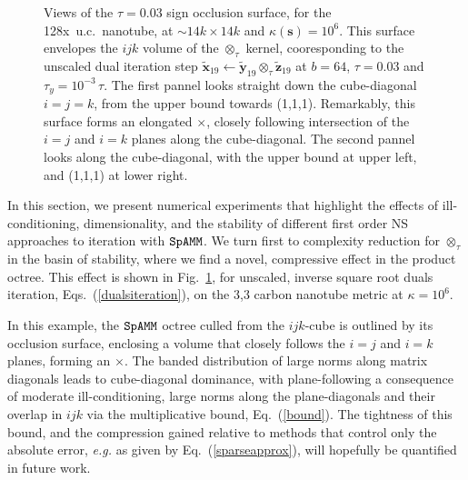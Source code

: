 \documentclass[letterpaper,twocolumn,amsmath,amsfont,amssymb,english,aps,jcp,preprintnumbers,groupaddress,nofootinbib,tightenlines]{revtex4}
\newcommand{\mat}[1]{\boldsymbol{#1}}
\newcommand{\mmat}[1]{\widetilde{\boldsymbol{#1}}}
\newcommand{\ot}{ {\scriptstyle \otimes}_{ \tau } }
\begin{document}
 \begin{figure}[h] \label{markofzorro}
 \caption{Views of the $\tau =0.03$ sign occlusion surface, for the 
 128x~u.c.~nanotube, at $\sim {14k \times 14k}$ and $\kappa(\mat{s})=10^6$. 
 This surface envelopes the $ijk$ volume of the $\ot$ kernel,  
 cooresponding to the unscaled dual iteration step $\mmat{x}_{19} \leftarrow \mmat{y}_{19} \ot \mmat{z}_{19} $ at $b=64$, $\tau=0.03$ and
 $\tau_y=10^{-3} \, \tau $.  The first pannel looks straight down the cube-diagonal $i=j=k$, from the upper bound towards (1,1,1).
 Remarkably, this surface forms an elongated $\times$, closely following intersection of the $i=j$  and $i=k$ planes 
 along the cube-diagonal. The second pannel looks along the cube-diagonal, with the upper bound at upper left, and (1,1,1) at lower right.}
 \end{figure}

In this section, we present  numerical experiments that highlight the effects of 
ill-conditioning, dimensionality, and the stability of different first order NS approaches to iteration with $\tt SpAMM$. 
We turn first to complexity reduction for $\ot$ in the basin of stability,  where we find a novel, compressive 
effect in the product octree.  This effect is shown in Fig.~\ref{markofzorro},  
for unscaled, inverse square root duals iteration, Eqs.~(\ref{dualsiteration}), on the 3,3 carbon 
nanotube metric at $\kappa=10^6$.  

In this example, the $\tt SpAMM$ octree culled from the $ijk$-cube is outlined by its occlusion surface, enclosing 
a volume that closely follows the $i=j$ and $i=k$ planes, forming an $\times$.  The banded distribution
of large norms along  matrix diagonals leads to cube-diagonal dominance, with plane-following 
a consequence of moderate ill-conditioning,  large norms along the plane-diagonals and their overlap in $ijk$
via the multiplicative bound, Eq.~(\ref{bound}). The tightness of this bound, and the compression gained relative
to  methods that control only the absolute error, {\em e.g.} as given by Eq.~(\ref{sparseapprox}), will hopefully
be quantified in future work. 
\end{document}
